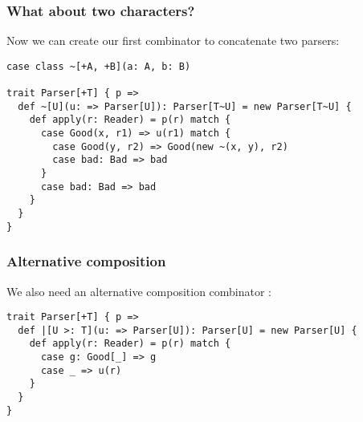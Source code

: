 \documentclass[t]{beamer}
\begin{document}
\begin{frame}[fragile]
\frametitle{What about two characters?}
Now we can create our first combinator \linline{~} to concatenate two parsers:
\begin{lstlisting}
case class ~[+A, +B](a: A, b: B)

trait Parser[+T] { p =>
  def ~[U](u: => Parser[U]): Parser[T~U] = new Parser[T~U] {
    def apply(r: Reader) = p(r) match {
      case Good(x, r1) => u(r1) match {
        case Good(y, r2) => Good(new ~(x, y), r2)
        case bad: Bad => bad
      }
      case bad: Bad => bad
    }
  }
}
\end{lstlisting}
\end{frame}

\begin{frame}[fragile]
\frametitle{Alternative composition}
We also need an alternative composition combinator \linline{|}:
\begin{lstlisting}
trait Parser[+T] { p =>
  def |[U >: T](u: => Parser[U]): Parser[U] = new Parser[U] {
    def apply(r: Reader) = p(r) match {
      case g: Good[_] => g
      case _ => u(r)
    }
  }
}
\end{lstlisting}
\end{frame}

\end{document}
